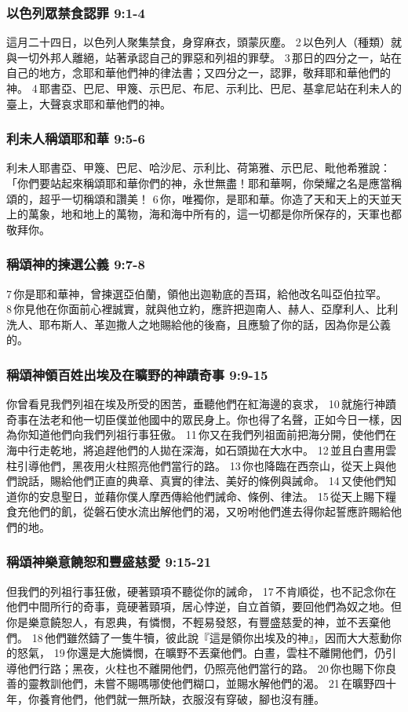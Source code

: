 \subsubsection{以色列眾禁食認罪 9:1-4}
這月二十四日，以色列人聚集禁食，身穿麻衣，頭蒙灰塵。 2 以色列人（種類）就與一切外邦人離絕，站著承認自己的罪惡和列祖的罪孽。 3 那日的四分之一，站在自己的地方，念耶和華他們神的律法書；又四分之一，認罪，敬拜耶和華他們的神。 4 耶書亞、巴尼、甲篾、示巴尼、布尼、示利比、巴尼、基拿尼站在利未人的臺上，大聲哀求耶和華他們的神。

\subsubsection{利未人稱頌耶和華 9:5-6}
利未人耶書亞、甲篾、巴尼、哈沙尼、示利比、荷第雅、示巴尼、毗他希雅說：「你們要站起來稱頌耶和華你們的神，永世無盡！耶和華啊，你榮耀之名是應當稱頌的，超乎一切稱頌和讚美！ 6 你，唯獨你，是耶和華。你造了天和天上的天並天上的萬象，地和地上的萬物，海和海中所有的，這一切都是你所保存的，天軍也都敬拜你。 

\subsubsection{稱頌神的揀選公義 9:7-8}
7 你是耶和華神，曾揀選亞伯蘭，領他出迦勒底的吾珥，給他改名叫亞伯拉罕。 8 你見他在你面前心裡誠實，就與他立約，應許把迦南人、赫人、亞摩利人、比利洗人、耶布斯人、革迦撒人之地賜給他的後裔，且應驗了你的話，因為你是公義的。


\subsubsection{稱頌神領百姓出埃及在曠野的神蹟奇事 9:9-15}
你曾看見我們列祖在埃及所受的困苦，垂聽他們在紅海邊的哀求， 10 就施行神蹟奇事在法老和他一切臣僕並他國中的眾民身上。你也得了名聲，正如今日一樣，因為你知道他們向我們列祖行事狂傲。 11 你又在我們列祖面前把海分開，使他們在海中行走乾地，將追趕他們的人拋在深海，如石頭拋在大水中。 12 並且白晝用雲柱引導他們，黑夜用火柱照亮他們當行的路。 13 你也降臨在西奈山，從天上與他們說話，賜給他們正直的典章、真實的律法、美好的條例與誡命。 14 又使他們知道你的安息聖日，並藉你僕人摩西傳給他們誡命、條例、律法。 15 從天上賜下糧食充他們的飢，從磐石使水流出解他們的渴，又吩咐他們進去得你起誓應許賜給他們的地。

\subsubsection{稱頌神樂意饒恕和豐盛慈愛 9:15-21}
但我們的列祖行事狂傲，硬著頸項不聽從你的誡命， 17 不肯順從，也不記念你在他們中間所行的奇事，竟硬著頸項，居心悖逆，自立首領，要回他們為奴之地。但你是樂意饒恕人，有恩典，有憐憫，不輕易發怒，有豐盛慈愛的神，並不丟棄他們。 18 他們雖然鑄了一隻牛犢，彼此說『這是領你出埃及的神』，因而大大惹動你的怒氣， 19 你還是大施憐憫，在曠野不丟棄他們。白晝，雲柱不離開他們，仍引導他們行路；黑夜，火柱也不離開他們，仍照亮他們當行的路。 20 你也賜下你良善的靈教訓他們，未嘗不賜嗎哪使他們糊口，並賜水解他們的渴。 21 在曠野四十年，你養育他們，他們就一無所缺，衣服沒有穿破，腳也沒有腫。 

